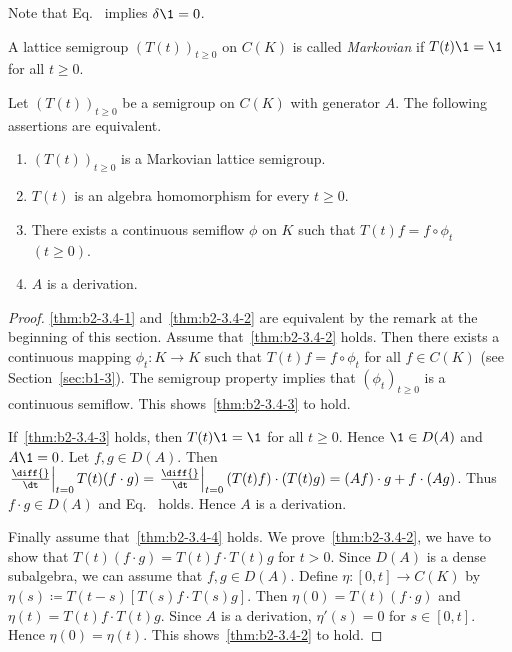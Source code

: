 Note that Eq.~ implies $\delta\1 = 0$.

A lattice semigroup $(T(t))_{t \geq 0}$ on $C(K)$ is called \emph{Markovian} if\/ $T(t)\1 = \1$ for all $t \geq 0$.

\begin{theorem}\label{thm:b2-3.4}
Let $(T(t))_{t \geq 0}$ be a semigroup on $C(K)$ with generator $A$.
The following assertions are equivalent.
\begin{enumerate}[\upshape (a)]
\item \label{thm:b2-3.4-1}
$(T(t))_{t \geq 0}$ is a Markovian lattice semigroup.
\item \label{thm:b2-3.4-2}
$T(t)$ is an algebra homomorphism for every $t \geq 0$.
\item \label{thm:b2-3.4-3}
There exists a continuous semiflow $\phi$ on $K$ such that $T(t)f = f \circ \phi_{t}$ $(t \geq 0)$.
\item \label{thm:b2-3.4-4}
$A$ is a derivation.
\end{enumerate}
\end{theorem}

\begin{proof}
\ref{thm:b2-3.4-1} and~\ref{thm:b2-3.4-2} are equivalent by the remark at the beginning of this section.
Assume that~\ref{thm:b2-3.4-2} holds.
Then there exists a continuous mapping $\phi_{t} \colon K \to K$ such that $T(t)f = f \circ \phi_{t}$ for all $f \in C(K)$ (see Section~\ref{sec:b1-3}).
The semigroup property implies that $(\phi_{t})_{t \geq 0}$ is a continuous semiflow.
This shows~\ref{thm:b2-3.4-3}  to hold.

If~\ref{thm:b2-3.4-3} holds, then $T(t)\1 = \1$ for all $t \geq 0$. Hence $\1 \in D(A)$ and $A\1 = 0$.
Let $f,g \in D(A)$.
Then $\left.\frac{\diff{}}{\dt}\right|_{t=0} T(t)(f \cdot g) = \left.\frac{\diff{}}{\dt}\right|_{t=0} (T(t)f) \cdot (T(t)g) = (Af) \cdot g + f \cdot (Ag)$.
Thus $f \cdot g \in D(A)$ and Eq.~ holds.
Hence $A$ is a derivation.

Finally assume that~\ref{thm:b2-3.4-4} holds.
We prove~\ref{thm:b2-3.4-2}, \ie  we have to show that $T(t)(f \cdot g) = T(t)f \cdot T(t)g$ for $t > 0$.
Since $D(A)$ is a dense subalgebra, we can assume that $f,g \in D(A)$.
Define $\eta \colon [0,t] \to C(K)$ by $\eta(s) \coloneqq T(t-s)[T(s)f \cdot T(s)g]$.
Then $\eta(0) = T(t)(f \cdot g)$ and $\eta(t) = T(t)f \cdot T(t)g$.
Since $A$ is a derivation, $\eta'(s) = 0$ for $s \in [0,t]$.
Hence $\eta(0) = \eta(t)$.
This shows~\ref{thm:b2-3.4-2} to hold.
\end{proof}

